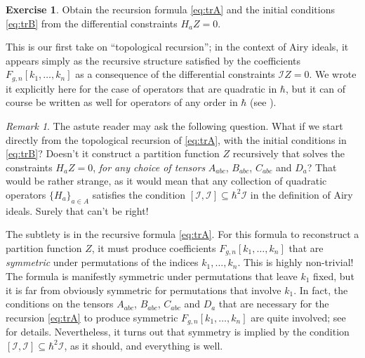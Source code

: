 \documentclass[reqno,oneside,11pt]{amsart}
\theoremstyle{plain}
\theoremstyle{definition}
\newtheorem*{exercise}{Exercise}
\theoremstyle{remark}
\newtheorem{remark}[theorem]{Remark}
\numberwithin{equation}{section}
\newcommand{\I}{\mathcal{I}}
\begin{document}
\begin{exercise}
Obtain the recursion formula \eqref{eq:trA} and the initial conditions \eqref{eq:trB} from the differential constraints $H_a Z = 0$.
\end{exercise}

This is our first take on ``topological recursion''; in the context of Airy ideals, it appears simply as the recursive structure satisfied by the coefficients $F_{g,n}[k_1,\ldots,k_n]$ as a consequence of the differential constraints $\I Z = 0$. We wrote it explicitly here for the case of operators that are quadratic in $\hbar$, but it can of course be written as well for operators of any order in $\hbar$ (see \cite{BBCCN18}).

\begin{remark}
The astute reader may ask the following question. What if we start directly from the topological recursion of \eqref{eq:trA}, with the initial conditions in \eqref{eq:trB}? Doesn't it construct a partition function $Z$ recursively that solves the constraints $H_a Z = 0$, \emph{for any choice of tensors} $A_{abc}$, $B_{abc}$, $C_{abc}$ and $D_a$? That would be rather strange, as it would mean that any collection of quadratic operators $\{H_a \}_{a \in A}$ satisfies the condition $[\I,\I]\subseteq \hbar^2 \I$ in the definition of Airy ideals. Surely that can't be right!

The subtlety is in the recursive formula \eqref{eq:trA}. For this formula to reconstruct a partition function $Z$, it must produce coefficients $F_{g,n}[k_1,\ldots, k_n]$ that are \emph{symmetric} under permutations of the indices $k_1,\ldots,k_n$. This is highly non-trivial! The formula is manifestly symmetric under permutations that leave $k_1$ fixed, but it is far from obviously symmetric for permutations that involve $k_1$. In fact, the conditions on the tensors $A_{abc}$, $B_{abc}$, $C_{abc}$ and $D_a$ that are necessary for the recursion \eqref{eq:trA} to produce symmetric $F_{g,n}[k_1,\ldots,k_n]$ are quite involved; see \cite{ABCO17} for details. Nevertheless, it turns out that symmetry is implied by the condition $[\I,\I] \subseteq \hbar^2 \I$, as it should, and everything is well.
\end{remark}



%
\end{document}
